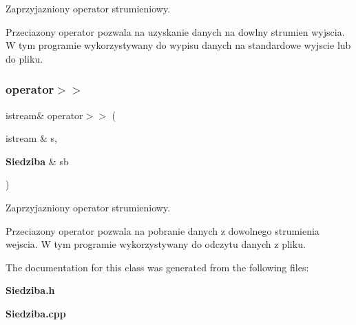 Zaprzyjazniony operator strumieniowy. 

Przeciazony operator pozwala na uzyskanie danych na dowlny strumien wyjscia. W tym programie wykorzystywany do wypisu danych na standardowe wyjscie lub do pliku. \mbox{\label{class_siedziba_ae5ef581c1d198741a15a44ad17c0960b}} 
\subsubsection{operator$>$$>$}
{\footnotesize\ttfamily istream\& operator$>$$>$ (\begin{DoxyParamCaption}\item[{istream \&}]{s,  }\item[{\textbf{ Siedziba} \&}]{sb }\end{DoxyParamCaption})\hspace{0.3cm}{\ttfamily [friend]}}



Zaprzyjazniony operator strumieniowy. 

Przeciazony operator pozwala na pobranie danych z dowolnego strumienia wejscia. W tym programie wykorzystywany do odczytu danych z pliku. 

The documentation for this class was generated from the following files\+:\begin{DoxyCompactItemize}
\item 
\textbf{ Siedziba.\+h}\item 
\textbf{ Siedziba.\+cpp}\end{DoxyCompactItemize}
